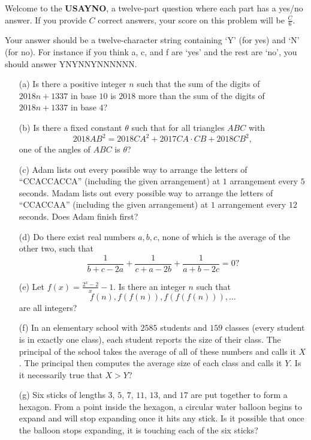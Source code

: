 Welcome to the \textbf{USAYNO}, a twelve-part question where each part has a yes/no answer. If you provide $C$ correct answers, your score on this problem will be $\frac{C}{6}$.

Your answer should be a twelve-character string containing `Y' (for yes) and `N' (for no). For instance if you think a, c, and f are `yes' and the rest are `no', you should answer YNYNNYNNNNNN.

\begin{itemize}

\item[(a)] Is there a positive integer $n$ such that the sum of the digits of $2018n+1337$ in base $10$ is $2018$ more than the sum of the digits of $2018n+1337$ in base $4$?

\item[(b)] Is there a fixed constant $\theta$ such that for all triangles $ABC$ with $$2018AB^2=2018CA^2+2017CA\cdot CB+2018CB^2,$$ one of the angles of $ABC$ is $\theta$?

\item[(c)] Adam lists out every possible way to arrange the letters of ``CCACCACCA'' (including the given arrangement) at $1$ arrangement every $5$ seconds. Madam lists out every possible way to arrange the letters of ``CCACCAA'' (including the given arrangement) at $1$ arrangement every $12$ seconds. Does Adam finish first?

\item[(d)] Do there exist real numbers $a,b,c$, none of which is the average of the other two, such that \[\frac{1}{b+c-2a}+\frac{1}{c+a-2b}+\frac{1}{a+b-2c}=0?\]

\item[(e)] Let $f\left(x\right)=\frac{2^x-2}{x}-1$. Is there an integer $n$ such that $$f\left(n\right),f\left(f\left(n\right)\right),f\left(f\left(f\left(n\right)\right)\right),\ldots$$ are all integers?

\item[(f)] In an elementary school with $2585$ students and $159$ classes (every student is in exactly one class), each student reports the size of their class. The principal of the school takes the average of all of these numbers and calls it $X$. The principal then computes the average size of each class and calls it $Y$. Is it necessarily true that $X>Y$?

\item[(g)] Six sticks of lengths $3$, $5$, $7$, $11$, $13$, and $17$ are put together to form a hexagon. From a point inside the hexagon, a circular water balloon begins to expand and will stop expanding once it hits any stick. Is it possible that once the balloon stops expanding, it is touching each of the six sticks?


\end{itemize}
